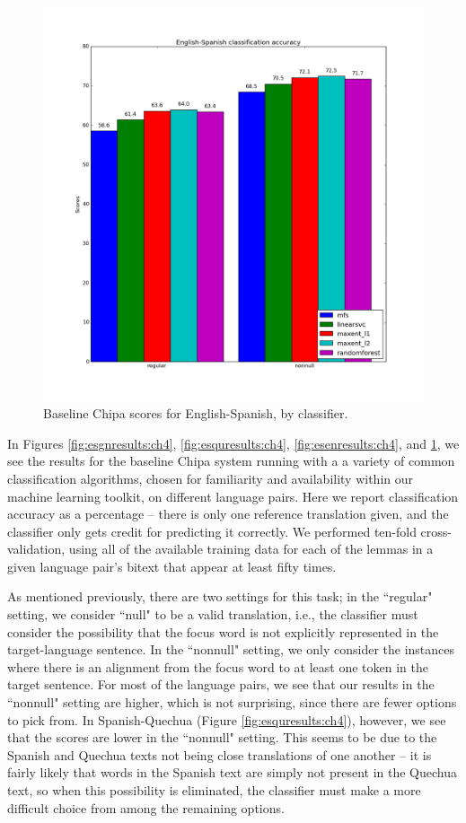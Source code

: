 \begin{figure}
  \includegraphics[width=\textwidth]{baseline-enes-ch4.png}
  \caption{Baseline Chipa scores for English-Spanish, by classifier.}
  \label{fig:enesresults:ch4}
\end{figure}

In Figures \ref{fig:esgnresults:ch4}, \ref{fig:esquresults:ch4},
\ref{fig:esenresults:ch4}, and \ref{fig:enesresults:ch4}, we see the results
for the baseline Chipa system running with a a variety of common classification
algorithms, chosen for familiarity and availability within our machine learning
toolkit, on different language pairs. Here we report classification accuracy as
a percentage -- there is only one reference translation given, and the
classifier only gets credit for predicting it correctly. We performed ten-fold
cross-validation, using all of the available training data for each of the
lemmas in a given language pair's bitext that appear at least fifty times. 

As mentioned previously, there are two settings for this task; in the
``regular" setting, we consider ``null" to be a valid translation, i.e., the
classifier must consider the possibility that the focus word is not explicitly
represented in the target-language sentence. In the ``nonnull" setting, we only
consider the instances where there is an alignment from the focus word to at
least one token in the target sentence. For most of the language pairs, we see
that our results in the ``nonnull" setting are higher, which is not surprising,
since there are fewer options to pick from. In Spanish-Quechua (Figure
\ref{fig:esquresults:ch4}), however, we see
that the scores are lower in the ``nonnull" setting. This seems to be due to
the Spanish and Quechua texts not being close translations of one another -- it
is fairly likely that words in the Spanish text are simply not present in the
Quechua text, so when this possibility is eliminated, the classifier must make
a more difficult choice from among the remaining options.

